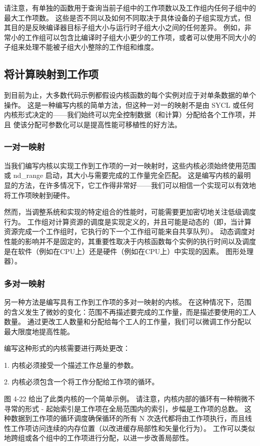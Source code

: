 请注意，有单独的函数用于查询当前子组中的工作项数以及工作组内任何子组中的最大工作项数。 这些是否不同以及如何不同取决于具体设备的子组实现方式，但其目的是反映编译器目标子组大小与运行时子组大小之间的任何差异。 例如，非常小的工作组可以包含比编译时子组大小更少的工作项，或者可以使用不同大小的子组来处理不能被子组大小整除的工作组和维度。

\subsection{将计算映射到工作项}
到目前为止，大多数代码示例都假设内核函数的每个实例对应于对单条数据的单个操作。 这是一种编写内核的简单方法，但这种一对一的映射不是由 SYCL 或任何内核形式决定的——我们始终可以完全控制数据（和计算）分配给各个工作项，并且 使该分配可参数化可以是提高性能可移植性的好方法。

\subsubsection{一对一映射}
当我们编写内核以实现工作到工作项的一对一映射时，这些内核必须始终使用范围或 nd\_range 启动，其大小与需要完成的工作量完全匹配。 这是编写内核的最明显的方法，在许多情况下，它工作得非常好——我们可以相信一个实现可以有效地将工作项映射到硬件。

然而，当调整系统和实现的特定组合的性能时，可能需要更加密切地关注低级调度行为。 工作组对计算资源的调度是实现定义的，并且可能是动态的（即，当计算资源完成一个工作组时，它执行的下一个工作组可能来自共享队列）。 动态调度对性能的影响并不是固定的，其重要性取决于内核函数每个实例的执行时间以及调度是在软件（例如在CPU上）还是硬件（例如在CPU上）中实现的因素。 图形处理器）。

\subsubsection{多对一映射}
另一种方法是编写具有工作到工作项的多对一映射的内核。 在这种情况下，范围的含义发生了微妙的变化：范围不再描述要完成的工作量，而是描述要使用的工人数量。 通过更改工人数量和分配给每个工人的工作量，我们可以微调工作分配以最大限度地提高性能。

编写这种形式的内核需要进行两处更改：

1. 内核必须接受一个描述工作总量的参数。

2. 内核必须包含一个将工作分配给工作项的循环。

图 4-22 给出了此类内核的一个简单示例。 请注意，内核内部的循环有一种稍微不寻常的形式 - 起始索引是工作项在全局范围内的索引，步幅是工作项的总数。 这种数据到工作项的循环调度确保循环的所有 N 次迭代都将由工作项执行，而且线性工作项访问连续的内存位置（以改进缓存局部性和矢量化行为）。 工作可以类似地跨组或各个组中的工作项进行分配，以进一步改善局部性。

